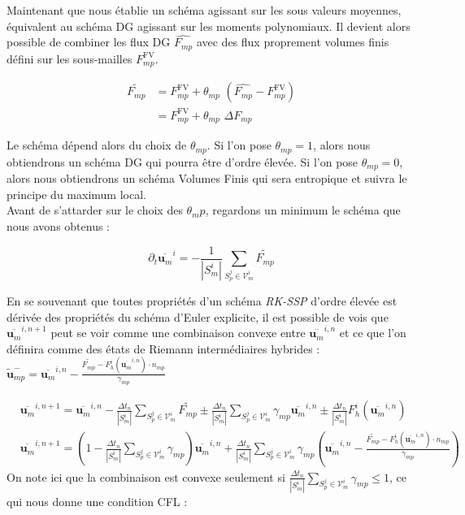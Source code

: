 Maintenant que nous établie un schéma agissant sur les sous valeurs moyennes, 
équivalent au schéma DG agissant sur les moments polynomiaux. 
Il devient alors possible de combiner les flux DG $\widehat{F_{mp}}$ 
avec des flux proprement volumes finis défini sur les sous-mailles $F^{\text{FV}}_{mp}$. 

\begin{equation} 
\begin{aligned}
    \widetilde{F_{mp}}  &= F^{\text{FV}}_{mp} + \theta_{mp}\,\, (\widehat{F_{mp}} - F^{\text{FV}}_{mp})\\
                        &= F^{\text{FV}}_{mp} + \theta_{mp}\,\, \Delta F_{mp}
\end{aligned}
\end{equation}

Le schéma dépend alors du choix de $\theta_{mp}$. 
Si l'on pose $\theta_{mp} = 1$, alors nous obtiendrons un schéma DG qui pourra être d'ordre élevée.
Si l'on pose $\theta_{mp} = 0$, alors nous obtiendrons un schéma Volumes Finis qui sera entropique et suivra le principe du maximum local. \\
Avant de s'attarder sur le choix des $\theta_mp$, regardons un minimum le schéma que nous avons obtenus : 

\begin{equation}\label{DG_as_FV}
    \partial_t \overline{\mathbf{u}_m}^i =  - \frac{1}{|S_m^i|} \sum_{S_p^j \in \mathcal{V}_m^i} \widetilde{F_{mp}}
\end{equation}

En se souvenant que toutes propriétés d'un schéma \textit{RK-SSP} d'ordre élevée est dérivée des propriétés du schéma d'Euler explicite, 
il est possible de vois que $\overline{\mathbf{u}_m}^{i,n+1}$ peut se voir comme une combinaison convexe entre $\overline{\mathbf{u}_m}^{i,n}$ et ce que l'on définira comme des états de Riemann intermédiaires hybrides : 
$ \widetilde{\mathbf{u}}_{mp}^- = \overline{\mathbf{u}_m}^{i,n} - \frac{\widetilde{F_{mp}} -  F_h^i(\overline{\mathbf{u}_m}^{i,n})\cdot n_{mp} }{\gamma_{mp}}$

\begin{align*}
&\overline{\mathbf{u}_m}^{i,n+1} = \overline{\mathbf{u}_m}^{i,n} - \frac{\Delta t_n}{|S_m^i|} \sum_{S_p^j \in \mathcal{V}_m^i} \widetilde{F_{mp}} 
\pm \frac{\Delta t_n}{|S_m^i|} \sum_{S_p^j \in \mathcal{V}_m^i} \gamma_{mp}\overline{\mathbf{u}_m}^{i,n} \pm \frac{\Delta t_n}{|S_m^i|} F_h^i(\overline{\mathbf{u}_m}^{i,n}) \\
&\overline{\mathbf{u}_m}^{i,n+1}= \left( 1-  \frac{\Delta t_n}{|S_m^i|} \sum_{S_p^j \in \mathcal{V}_m^i} \gamma_{mp}\right) \overline{\mathbf{u}_m}^{i,n} 
                                + \frac{\Delta t_n}{|S_m^i|} \sum_{S_p^j \in \mathcal{V}_m^i} \gamma_{mp} \left( \overline{\mathbf{u}_m}^{i,n} - \frac{\widetilde{F_{mp}} -  F_h^i(\overline{\mathbf{u}_m}^{i,n})\cdot n_{mp} }{\gamma_{mp}} \right)
\end{align*}
On note ici que la combinaison est convexe seulement si $ \frac{\Delta t_n}{|S_m^i|} \sum_{S_p^j \in \mathcal{V}_m^i} \gamma_{mp} \leq 1$, ce qui nous donne une condition CFL : 

